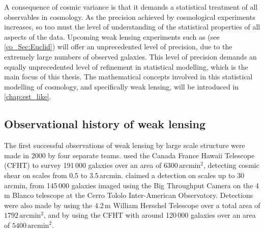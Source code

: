 A consequence of cosmic variance is that it demands a statistical treatment of all observables in cosmology.
As the precision achieved by cosmological experiments increases, so too must the level of understanding of the statistical properties of all aspects of the data. Upcoming weak lensing experiments such as \Euclid{} (see \autoref{co_Sec:Euclid}) will offer an unprecedented level of precision, due to the extremely large numbers of observed galaxies. This level of precision demands an equally unprecedented level of refinement in statistical modelling, which is the main focus of this thesis. The mathematical concepts involved in this statistical modelling of cosmology, and specifically weak lensing, will be introduced in \autoref{chap:est_like}.

\subsection{Observational history of weak lensing}
\label{co_Sec:observational_history}

The first successful observations of weak lensing by large scale structure were made in 2000 by four separate teams. \citet{VanWaerbeke2000} used the Canada France Hawaii Telescope (CFHT) to survey 191\,000 galaxies over an area of $6300\,\text{arcmin}^2$, detecting cosmic shear on scales from 0.5 to 3.5\,arcmin. \citet{Wittman2000} claimed a detection on scales up to 30\,arcmin, from 145\,000 galaxies imaged using the Big Throughput Camera \citep{Wittman1998} on the 4\,m Blanco telescope at the Cerro Tololo Inter-American Observatory. Detections were also made by \citet{Bacon2000} using the 4.2\,m William Herschel Telescope \citep{Boksenberg1985} over a total area of $1792\,\text{arcmin}^2$, and by \citet{Kaiser2000} using the CFHT with around 120\,000 galaxies over an area of $5400\,\text{arcmin}^2$.

